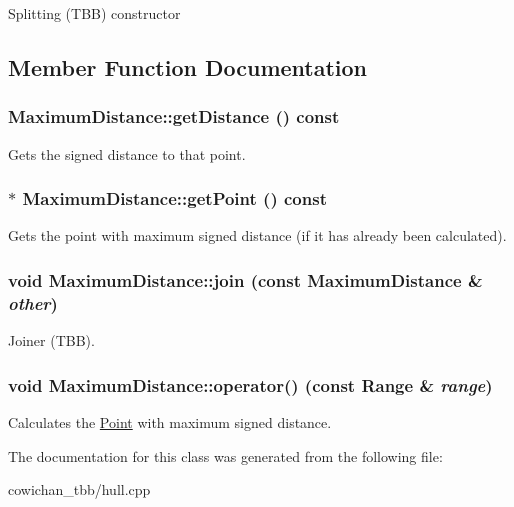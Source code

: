 Splitting (TBB) constructor 

\subsection{Member Function Documentation}
\hypertarget{class_maximum_distance_1a187dd3950b791434bb5223d6b16882}{
\subsubsection[{getDistance}]{ MaximumDistance::getDistance () const}}
\label{class_maximum_distance_1a187dd3950b791434bb5223d6b16882}


Gets the signed distance to that point. \hypertarget{class_maximum_distance_8e1dae43c6ec3865ea79dd7caf27ad8f}{
\subsubsection[{getPoint}]{$\ast$ MaximumDistance::getPoint () const}}
\label{class_maximum_distance_8e1dae43c6ec3865ea79dd7caf27ad8f}


Gets the point with maximum signed distance (if it has already been calculated). \hypertarget{class_maximum_distance_8e224531b8c5e9a9f9e506f3e674586b}{
\subsubsection[{join}]{\setlength{\rightskip}{0pt plus 5cm}void MaximumDistance::join (const {\bf MaximumDistance} \& {\em other})}}
\label{class_maximum_distance_8e224531b8c5e9a9f9e506f3e674586b}


Joiner (TBB). \hypertarget{class_maximum_distance_69c66442a93a92b18266ba55909f6c15}{
\subsubsection[{operator()}]{\setlength{\rightskip}{0pt plus 5cm}void MaximumDistance::operator() (const {\bf Range} \& {\em range})}}
\label{class_maximum_distance_69c66442a93a92b18266ba55909f6c15}


Calculates the \hyperlink{class_point}{Point} with maximum signed distance. 

The documentation for this class was generated from the following file:\begin{CompactItemize}
\item 
cowichan\_\-tbb/hull.cpp\end{CompactItemize}
